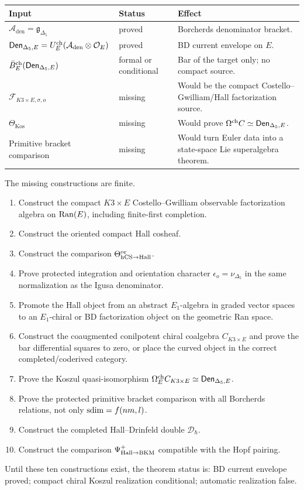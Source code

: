 \begin{center}
\begingroup
\small
\begin{tabular}{p{}|p{}|p{}}
\textbf{Input} & \textbf{Status} & \textbf{Effect}\\ \hline
\(\mathcal A_{\mathrm{den}}=\mathfrak g_{\Delta_5}\) &
proved &
Borcherds denominator bracket.\\
\(\mathsf{Den}_{\Delta_5,E}=U_E^{\mathrm{ch}}(\mathcal A_{\mathrm{den}}\otimes
\mathcal O_E)\) &
proved &
BD current envelope on \(E\).\\
\(\bar B_E^{\mathrm{ch}}(\mathsf{Den}_{\Delta_5,E})\) &
formal or conditional &
Bar of the target only; no compact source.\\
\(\mathcal F_{K3\times E,\sigma,o}\) &
missing &
Would be the compact Costello--Gwilliam/Hall factorization source.\\
\(\Theta_{\mathrm{Kos}}\) &
missing &
Would prove \(\Omega^{\mathrm{ch}} C\simeq\mathsf{Den}_{\Delta_5,E}\).\\
Primitive bracket comparison &
missing &
Would turn Euler data into a state-space Lie superalgebra theorem.
\end{tabular}
\endgroup
\end{center}

\begin{remark}
\label{rem:finite-koszul-checklist}
The missing constructions are finite.
\begin{enumerate}
\item Construct the compact \(K3\times E\) Costello--Gwilliam observable
factorization algebra on \(\operatorname{Ran}(E)\), including finite-first completion.
\item Construct the oriented compact Hall cosheaf.
\item Construct the comparison \(\Theta_{\mathrm{hCS}\to\mathrm{Hall}}^{\mathrm{or}}\).
\item Prove protected integration and orientation character
\(\epsilon_o=\nu_{\Delta_5}\) in the same normalization as the Igusa
denominator.
\item Promote the Hall object from an abstract \(E_1\)-algebra in graded
vector spaces to an \(E_1\)-chiral or BD factorization object on the
geometric Ran space.
\item Construct the coaugmented conilpotent chiral coalgebra
\(C_{K3\times E}\) and prove the bar differential squares to zero, or
place the curved object in the correct completed/coderived category.
\item Prove the Koszul quasi-isomorphism
\(\Omega^{\mathrm{ch}}_E C_{K3\times E}\simeq\mathsf{Den}_{\Delta_5,E}\).
\item Prove the protected primitive bracket comparison with all
Borcherds relations, not only
\(\operatorname{sdim}=f(nm,l)\).
\item Construct the completed Hall--Drinfeld double \(\mathcal D_\hbar\).
\item Construct the comparison \(\Psi^+_{\mathrm{Hall}\to\mathrm{BKM}}\) compatible with
the Hopf pairing.
\end{enumerate}
Until these ten constructions exist, the theorem status is:
BD current envelope proved; compact chiral Koszul realization
conditional; automatic realization false.
\end{remark}
